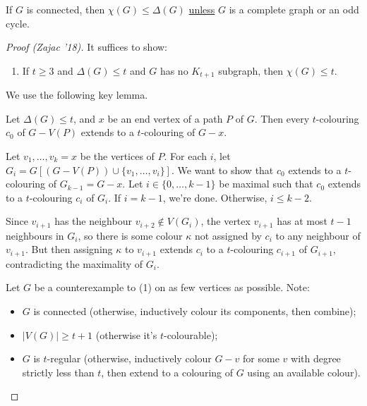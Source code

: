 \documentclass[main.tex]{subfiles}
\begin{document}
\begin{theorem}
  If $G$ is connected, then $\chi(G)\leq\Delta(G)$ \underline{unless} $G$ is
  a complete graph or an odd cycle.
\end{theorem}
\begin{proof}[Proof (Zajac '18)]
  It suffices to show:
  \begin{enumerate}[label=(\arabic*)]
    \item If $t\geq 3$ and $\Delta(G)\leq t$ and $G$ has no $K_{t+1}$ subgraph,
      then $\chi(G)\leq t$.
  \end{enumerate}
  We use the following key lemma.
  \begin{lemma}
    Let $\Delta(G)\leq t$, and $x$ be an end vertex of a path $P$ of $G$.
    Then every $t$-colouring $c_0$ of $G - V(P)$ extends to a $t$-colouring
    of $G - x$.
  \end{lemma}
  \begin{subproof}
    Let $v_1,\ldots,v_k = x$ be the vertices of $P$.
    For each $i$, let $G_i = G[(G - V(P))\cup\{v_1,\ldots,v_i\}]$.
    We want to show that $c_0$ extends to a $t$-colouring of $G_{k-1} = G - x$.
    Let $i\in\{0,\ldots,k-1\}$ be maximal such that $c_0$ extends to a
    $t$-colouring $c_i$ of $G_i$.
    If $i = k-1$, we're done.
    Otherwise, $i\leq k-2$.

    Since $v_{i+1}$ has the neighbour $v_{i+2}\notin V(G_i)$, the vertex
    $v_{i+1}$ has at most $t-1$ neighbours in $G_i$, so there is some colour
    $\kappa$ not assigned by $c_i$ to any neighbour of $v_{i+1}$.
    But then assigning $\kappa$ to $v_{i+1}$ extends $c_i$ to a $t$-colouring
    $c_{i+1}$ of $G_{i+1}$, contradicting the maximality of $G_i$.
  \end{subproof}
  Let $G$ be a counterexample to (1) on as few vertices as possible.
  Note:
  \begin{itemize}
    \item $G$ is connected (otherwise, inductively colour its components,
      then combine);

    \item $|V(G)|\geq t+1$ (otherwise it's $t$-colourable);

    \item $G$ is $t$-regular (otherwise, inductively colour $G - v$ for some
      $v$ with degree strictly less than $t$, then extend to a colouring of
      $G$ using an available colour).
  \end{itemize}


\end{proof}
\end{document}
